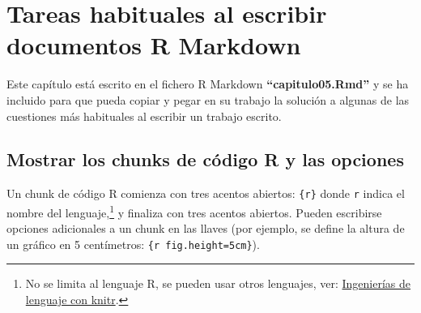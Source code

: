 \documentclass[12pt,a4paper,]{book}
\title{}
\author{Nombre Completo Autor}
\date{27/10/2017}
\def\ifdoblecara{} %
\def\ifprincipal{} %
\let\ifprincipal\undefined %
\let\rmarkdownfootnote\footnote%
\def\footnote{\protect\rmarkdownfootnote}
\numberwithin{dummy}{section}
\theoremstyle{ocrenumbox}
\theoremstyle{blacknumex}
\theoremstyle{blacknumbox}
\theoremstyle{ocrenum}
\theoremstyle{ocrenum}
\begin{document}
\raggedbottom

\ifdefined\ifprincipal
\else
\setlength{\parindent}{1em}
\pagestyle{fancy}
\setcounter{tocdepth}{4}
\tableofcontents

\nocite{Luque2017,Luque2019,RStudio,R-base,
R-knitr,R-rmarkdown,R-dplyr,R-ggplot2,Techopedia}

\fi

\ifdefined\ifdoblecara
\fancyhead{}{}
\fancyhead[LE,RO]{\scriptsize\rightmark}
\fancyfoot[LO,RE]{\scriptsize\slshape \leftmark}
\fancyfoot[C]{}
\fancyfoot[LE,RO]{\footnotesize\thepage}
\else
\fancyhead{}{}
\fancyhead[RO]{\scriptsize\rightmark}
\fancyfoot[LO]{\scriptsize\slshape \leftmark}
\fancyfoot[C]{}
\fancyfoot[RO]{\footnotesize\thepage}
\fi

\renewcommand{\headrulewidth}{0.4pt}
\renewcommand{\footrulewidth}{0.4pt}

\hypertarget{tareas-habituales-al-escribir-documentos-r-markdown}{%
\chapter{Tareas habituales al escribir documentos R
Markdown}\label{tareas-habituales-al-escribir-documentos-r-markdown}}

Este capítulo está escrito en el fichero R Markdown
\textbf{``capitulo05.Rmd''} y se ha incluido para que pueda copiar y
pegar en su trabajo la solución a algunas de las cuestiones más
habituales al escribir un trabajo escrito.

\hypertarget{mostrar-los-chunks-de-cuxf3digo-r-y-las-opciones}{%
\section{Mostrar los chunks de código R y las
opciones}\label{mostrar-los-chunks-de-cuxf3digo-r-y-las-opciones}}

Un chunk de código R comienza con tres acentos abiertos:
\texttt{\textasciigrave{}\textasciigrave{}\textasciigrave{}\{r\}} donde
\texttt{r} indica el nombre del lenguaje,\footnote{No se limita al
  lenguaje R, se pueden usar otros lenguajes, ver:
  \href{https://rmarkdown.rstudio.com/authoring_knitr_engines.html\%23sql}{Ingenierías
  de lenguaje con knitr}.} y finaliza con tres acentos abiertos. Pueden
escribirse opciones adicionales a un chunk en las llaves (por ejemplo,
se define la altura de un gráfico en 5 centímetros:
\texttt{\textasciigrave{}\textasciigrave{}\textasciigrave{}\{r\ fig.height=\textquotesingle{}5cm\textquotesingle{}\}}).
\end{document}
